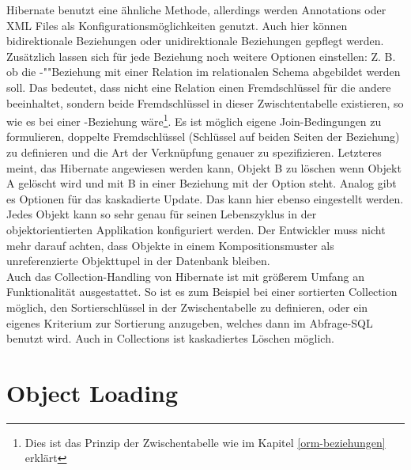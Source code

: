 Hibernate benutzt eine ähnliche Methode, allerdings werden Annotations oder XML Files als Konfigurationsmöglichkeiten genutzt. Auch hier können bidirektionale Beziehungen oder unidirektionale Beziehungen gepflegt werden. Zusätzlich lassen sich für jede Beziehung noch weitere Optionen einstellen: Z. B. ob die -""Be\-zieh\-ung mit einer Relation im relationalen Schema abgebildet werden soll. Das bedeutet, dass nicht eine Relation einen Fremdschlüssel für die andere beeinhaltet, sondern beide Fremdschlüssel in dieser Zwischtentabelle existieren, so wie es bei einer -Beziehung wäre\footnote{Dies ist das Prinzip der Zwischentabelle wie im Kapitel \ref{orm-beziehungen} erklärt}. Es ist möglich eigene Join-Bedingungen zu formulieren, doppelte Fremdschlüssel (Schlüssel auf beiden Seiten der Beziehung) zu definieren und die Art der Verknüpfung genauer zu spezifizieren. Letzteres meint, das Hibernate angewiesen werden kann, Objekt B zu löschen wenn Objekt A gelöscht wird und mit B in einer Beziehung mit der Option  steht. Analog gibt es Optionen für das kaskadierte Update. Das  kann hier ebenso eingestellt werden. Jedes Objekt kann so sehr genau für seinen Lebenszyklus in der objektorientierten Applikation konfiguriert werden. Der Entwickler muss nicht mehr darauf achten, dass Objekte in einem Kompositionsmuster als unreferenzierte Objekttupel in der Datenbank bleiben. \\
Auch das Collection-Handling von Hibernate ist mit größerem Umfang an Funktionalität ausgestattet. So ist es zum Beispiel bei einer sortierten Collection möglich, den Sortierschlüssel in der Zwischentabelle zu definieren, oder ein eigenes Kriterium zur Sortierung anzugeben, welches dann im Abfrage-SQL benutzt wird. Auch in Collections ist kaskadiertes Löschen möglich. \\

\section{Object Loading}

